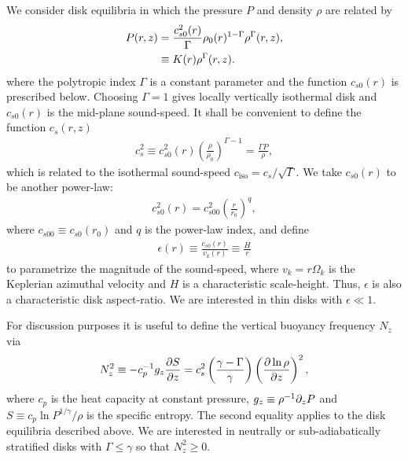 We consider disk equilibria in which the pressure $P$ and density
$\rho$ are related by   
\begin{align}
  P(r,z) &= 
  \frac{c_{s0}^2(r)}{\Gamma}\rho_0(r)^{1-\Gamma}\rho^\Gamma(r,z),\notag\\
  & \equiv K(r)\rho^{\Gamma}(r,z). \label{eqm_press}
\end{align}
where the polytropic index $\Gamma$ is a  constant parameter  and the
function $c_{s0}(r)$ is prescribed below. Choosing $\Gamma=1$ gives 
locally vertically isothermal disk and $c_{s0}(r)$ is the mid-plane
sound-speed. %
It shall be convenient to define the function $c_s(r,z)$ 
\begin{align}
  c_s^2\equiv %
  c_{s0}^2(r)\left(\frac{\rho}{\rho_0}\right)^{\Gamma-1} =
  \frac{\Gamma P}{\rho}, 
\end{align}
which is related to the isothermal sound-speed $c_\mathrm{iso} =
c_s/\sqrt{\Gamma}$. We take $c_{s0}(r)$ to be another power-law:  
\begin{align}
  c_{s0}^2(r)=c_{s00}^2\left(\frac{r}{r_0}\right)^q, 
\end{align}
where $c_{s00}\equiv c_{s0}(r_0)$  and $q$ is the power-law index, and
define   
\begin{align}
  \epsilon(r) \equiv \frac{c_{s0}(r)}{v_k(r)} \equiv
  \frac{H}{r} 
\end{align}
to parametrize the magnitude of the sound-speed, where
$v_k=r\Omega_k$ is the Keplerian azimuthal velocity and
$H$ is a characteristic scale-height.  Thus, $\epsilon$
is also a characteristic disk aspect-ratio. We are 
interested in thin disks with $\epsilon \ll 1$.%

For discussion purposes it is useful to define the vertical buoyancy
frequency $N_z$ via
\begin{align}
  N_z^2 \equiv - c_p^{-1}g_z \frac{\partial S}{\partial z} = c_s^2 \left(\frac{\gamma -
      \Gamma}{\gamma}\right)\left(\frac{\partial\ln\rho}{\partial z}\right)^2,   
\end{align}
where $c_p$ is the heat capacity at constant pressure, $g_z\equiv
\rho^{-1}\partial_zP $ and $S\equiv c_p\ln{P^{1/\gamma}/\rho}$ is the
specific entropy. The second equality applies to the disk equilibria
described above. 
We are interested in
neutrally or sub-adiabatically stratified 
disks with $\Gamma\leq \gamma$ so that $N_z^2\geq0$.  


